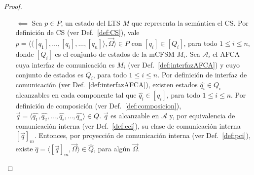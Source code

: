 \begin{proof}
\begin{itemize}
    \item[$\impliedby$] Sea $p \in P$, un estado del LTS $M$ que representa la semántica el CS. Por definición de CS (ver Def.~\ref{def:CS}), vale $p = \langle \langle [q_1],\ldots,[q_i], \ldots, [q_n] \rangle, \overrightarrow{\Omega} \rangle \in P$ con $[q_i] \in [Q_i]$, para todo $1 \leq i \leq n$, donde $[Q_i]$ es el conjunto de estados de la mCFSM $M_i$. Sea $\mathcal{A}_i$ el AFCA cuya interfaz de comunicación es $M_i$ (ver Def.~\ref{def:interfazAFCA}) y cuyo conjunto de estados es $Q_i$, para todo $1 \leq i \leq n$. Por definición de interfaz de comunicación (ver Def.~\ref{def:interfazAFCA}), existen estados $\widehat{q_i} \in Q_i$ alcanzables en cada componente tal que $\widehat{q_i} \in [q_i]$, para todo $1 \leq i \leq n$. Por definición de composición (ver Def.~\ref{def:composicion}), $\overrightarrow{q} = \langle \widehat{q_1}, \widehat{q_2}, \ldots, \widehat{q_i}, \ldots, \widehat{q_n} \rangle \in Q$. $\overrightarrow{q}$ es alcanzable en $\mathcal{A}$ y, por equivalencia de comunicación interna (ver Def.~\ref{def:eci}), su clase de comunicación interna $[\overrightarrow{q}]_m$. Entonces, por proyección de comunicación interna (ver Def.~\ref{def:pci}), existe $\widehat{q} = \langle [\overrightarrow{q}]_m, \overrightarrow{\Omega} \rangle \in \widehat{Q}$, para algún $\overrightarrow{\Omega}$.
\end{itemize}
\end{proof}

